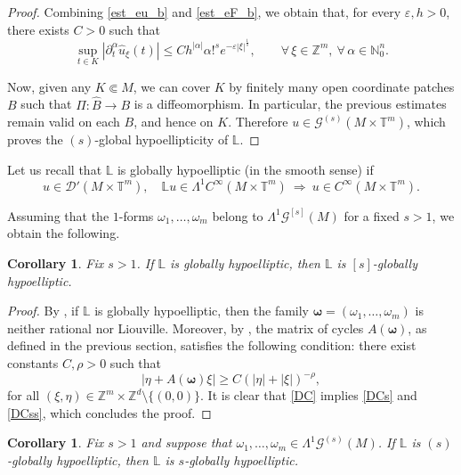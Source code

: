 \documentclass[11pt,reqno]{amsart}
\numberwithin{equation}{section}
\newtheorem{corollary}[theorem]{Corollary}
\begin{document}
\begin{proof}
		Combining \eqref{est_eu_b} and \eqref{est_eF_b}, we obtain that, for every \(\varepsilon,h>0\), there exists \(C>0\) such that
		\[
		\sup_{t\in K}|\partial_t^\alpha\widehat{u}_\xi(t)|
		\leq
		Ch^{|\alpha|}\alpha!^s e^{-\varepsilon|\xi|^{\frac{1}{s}}},\qquad\forall\,\xi\in\mathbb{Z}^m,\ \forall\,\alpha\in\mathbb{N}_0^n.
		\]
	
		Now, given any \(K\Subset M\), we can cover \(K\) by finitely many open coordinate patches \(B\) such that
		\(\Pi:\hat B\to B\) is a diffeomorphism. In particular, the previous estimates remain valid on each $B$, and hence on \(K\).
		Therefore \(u\in\mathscr{G}^{(s)}(M\times\mathbb{T}^m)\), which proves the \((s)\)-global hypoellipticity of \(\mathbb{L}\).
		\end{proof}
		
		Let us recall that \(\mathbb{L}\) is globally hypoelliptic (in the smooth sense) if
		\[
		u\in\mathscr{D}'(M\times\mathbb{T}^m),
		\quad
		\mathbb{L}u\in\mathsf{\Lambda}^1 C^\infty(M\times\mathbb{T}^m)
		\ \Longrightarrow\
		u\in C^\infty(M\times\mathbb{T}^m).
		\]
		
		Assuming that the \(1\)-forms \(\omega_1,\dots,\omega_m\) belong to \(\mathsf{\Lambda}^1\mathscr{G}^{[s]}(M)\) for a fixed \(s>1\), we obtain the following.
		
		\begin{corollary}
			Fix \(s>1\). If \(\mathbb{L}\) is globally hypoelliptic, then \(\mathbb{L}\) is \([s]\)-globally hypoelliptic.
		\end{corollary}
		
		\begin{proof}
			By \cite[Theorem 3.3]{CKMT}, if \(\mathbb{L}\) is globally hypoelliptic, then the family
			\(\boldsymbol{\omega}=(\omega_1,\dots,\omega_m)\) is neither rational nor Liouville.
			Moreover, by \cite[Proposition 3.8 (ii)]{CKMT}, the matrix of cycles \(A(\boldsymbol{\omega})\), as defined in the previous section, satisfies the following condition: there exist constants \(C,\rho>0\) such that
			\begin{equation}\label{DC}
				|\eta+A(\boldsymbol{\omega})\xi|
				\geq C(|\eta|+|\xi|)^{-\rho},
				\tag{DC}
			\end{equation}
			for all \((\xi,\eta)\in\mathbb{Z}^m\times\mathbb{Z}^d\setminus\{(0,0)\}\).
			It is clear that \eqref{DC} implies \eqref{DCs} and \eqref{DCss}, which concludes the proof.
		\end{proof}
		
	\begin{corollary}
		Fix \(s>1\) and suppose that \(\omega_1,\dots,\omega_m\in\mathsf{\Lambda}^1\mathscr{G}^{(s)}(M)\).
		If \(\mathbb{L}\) is \((s)\)-globally hypoelliptic, then \(\mathbb{L}\) is \(s\)-globally hypoelliptic.
	\end{corollary}
	
\end{document}
